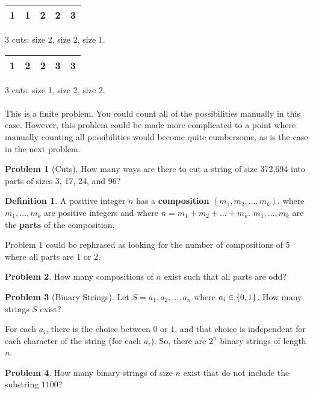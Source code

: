 \documentclass[]{article}
\theoremstyle{definition}
\newtheorem{problem}{Problem}[section]
\newtheorem*{defn}{Definition}
\DeclarePairedDelimiter{\set}{\lbrace}{\rbrace}
\begin{document}
			\begin{tabular}{|c|c|c|c|c|}
				\hline
				1 & 1 & 2 & 2 & 3 \\
				\hline
			\end{tabular}
			3 cuts: size 2, size 2, size 1.
		
			\begin{tabular}{|c|c|c|c|c|}
				\hline
				1 & 2 & 2 & 3 & 3 \\
				\hline
			\end{tabular}
			3 cuts: size 1, size 2, size 2.
			\\ \\
			This is a finite problem. You could count all of the possibilities manually in this case. However, this problem could be made more complicated to a point where manually counting all possibilities would become quite cumbersome, as is the case in the next problem.
		
			\begin{problem}[Cuts]
				How many ways are there to cut a string of size 372,694 into parts of sizes 3, 17, 24, and 96?
			\end{problem}
		
			\begin{defn}
				A positive integer $n$ has a \textbf{composition} $(m_1, m_2, \ldots, m_k)$, where $m_1, \ldots, m_k$ are positive integers and where $n = m_1 + m_2 + \ldots + m_k$. $m_1, \ldots, m_k$ are the \textbf{parts} of the composition.
			\end{defn}
		
			Problem 1 could be rephrased as looking for the number of compositions of 5 where all parts are 1 or 2.
		
			\begin{problem}
				How many compositions of $n$ exist such that all parts are odd?
			\end{problem}
		
			\begin{problem}[Binary Strings]
				Let $S = a_1, a_2, \ldots, a_n$ where $a_i \in \set{0, 1}$. How many strings $S$ exist?
			\end{problem}
		
			For each $a_i$, there is the choice between $0$ or $1$, and that choice is independent for each character of the string (for each $a_i$). So, there are $2^n$ binary strings of length $n$.
		
			\begin{problem}
				How many binary strings of size $n$ exist that do not include the substring $1100$?
			\end{problem}
		
\end{document}
